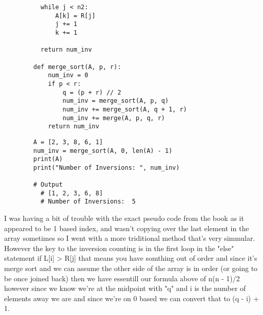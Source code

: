 \documentclass{article}
\begin{document}
\begin{enumerate}
\begin{enumerate}
\begin{lstlisting}
          while j < n2: 
              A[k] = R[j] 
              j += 1
              k += 1
          
          return num_inv
              
        def merge_sort(A, p, r):
            num_inv = 0
            if p < r:
                q = (p + r) // 2
                num_inv = merge_sort(A, p, q)
                num_inv += merge_sort(A, q + 1, r)
                num_inv += merge(A, p, q, r)            
            return num_inv
      \end{lstlisting}
      \begin{lstlisting}
        A = [2, 3, 8, 6, 1]
        num_inv = merge_sort(A, 0, len(A) - 1)
        print(A)
        print("Number of Inversions: ", num_inv)

        # Output
          # [1, 2, 3, 6, 8]
          # Number of Inversions:  5
      \end{lstlisting}
      I was having a bit of trouble with the exact pseudo code from the book as it appeared to be 1 based index, and wasn't copying over the last element in the array sometimes so I went with a more triditional method that's very simmular. However the key to the inversion counting is in the first loop in the "else" statement if L[i] > R[j] that means you have somthing out of order and since it's merge sort and we can assume the other side of the array is in order (or going to be once joined back) then we have essentill our formula above of n(n - 1)/2 however since we know we're at the midpoint with "q" and i is the number of elements away we are and since we're on 0 based we can convert that to (q - i) + 1.

    \end{enumerate}
    
  \end{enumerate}
\end{document}
